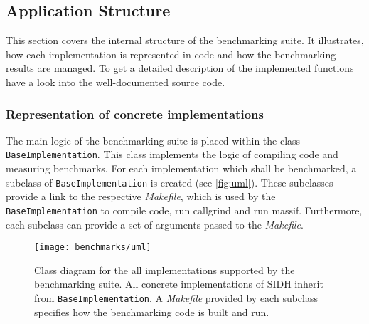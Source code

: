 \subsection{Application Structure}

This section covers the internal structure of the benchmarking suite. It illustrates, how each implementation is represented in code and how the benchmarking results are managed. To get a detailed description of the implemented functions have a look into the well-documented source code.

\subsubsection{Representation of concrete implementations}

The main logic of the benchmarking suite is placed within the class \texttt{BaseImplementation}. This class implements the logic of compiling code and measuring benchmarks. For each implementation which shall be benchmarked, a subclass of \texttt{BaseImplementation} is created (see \autoref{fig:uml}). These subclasses provide a link to the respective \textit{Makefile}, which is used by the \texttt{BaseImplementation} to compile code, run callgrind and run massif. Furthermore, each subclass can provide a set of arguments passed to the \textit{Makefile}.\\

\begin{figure}[H]
  \centering
  \texttt{[image: benchmarks/uml]}
  \caption[Class diagram for the all implementations supported by the benchmarking suite.]
  {Class diagram for the all implementations supported by the benchmarking suite. All concrete implementations of SIDH inherit from \texttt{BaseImplementation}. A \textit{Makefile} provided by each subclass specifies how the benchmarking code is built and run.} \label{fig:uml}
\end{figure}

